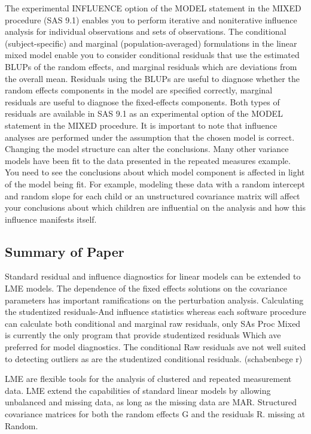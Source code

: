 \documentclass[Main.tex]{subfiles}
\begin{document}
The experimental INFLUENCE
option of the MODEL statement in the MIXED procedure (SAS 9.1) enables you to perform iterative and
noniterative influence analysis for individual observations and sets of observations.
The conditional (subject-specific) and marginal (population-averaged) formulations in the linear mixed model
enable you to consider conditional residuals that use the estimated BLUPs of the random effects, and
marginal residuals which are deviations from the overall mean. Residuals using the BLUPs are useful to
diagnose whether the random effects components in the model are specified correctly, marginal residuals
are useful to diagnose the fixed-effects components. Both types of residuals are available in SAS 9.1 as an
experimental option of the MODEL statement in the MIXED procedure.
It is important to note that influence analyses are performed under the assumption that the chosen model
is correct. Changing the model structure can alter the conclusions. Many other variance models have been
fit to the data presented in the repeated measures example. You need to see the conclusions about which
model component is affected in light of the model being fit. For example, modeling these data with a random
intercept and random slope for each child or an unstructured covariance matrix will affect your conclusions
about which children are influential on the analysis and how this influence manifests itself.
\subsection{Summary of Paper}
Standard residual and influence diagnostics for linear models can be extended to LME models.
The dependence of the fixed effects solutions on the covariance parameters has important ramifications on the perturbation analysis.	
Calculating the studentized residuals-And influence statistics whereas each software procedure can calculate both conditional and marginal raw residuals, only SAs Proc Mixed is currently the only program that provide studentized residuals Which ave preferred for model diagnostics. The conditional Raw residuals ave not well suited to detecting outliers as are the studentized conditional residuals. (schabenbege r)


LME are flexible tools for the analysis of clustered and repeated measurement data. LME extend the capabilities of standard linear models by allowing unbalanced and missing data, as long as the missing data are MAR. Structured covariance matrices for both the random effects G and the residuals R. missing at Random.
\end{document}
